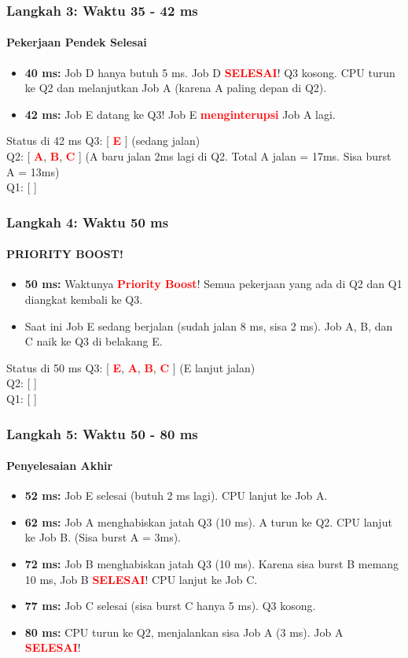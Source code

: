 \documentclass[t,aspectratio=169,xcolor=dvipsnames]{beamer}
\newcommand{\tem}[1]{\textbf{\textcolor{red}{#1}}}
\begin{document}
\begin{frame}
    \frametitle{Langkah 3: Waktu 35 - 42 ms}
    \framesubtitle{Pekerjaan Pendek Selesai}
    \footnotesize
    \begin{itemize}
        \item \textbf{40 ms:} Job D hanya butuh 5 ms. Job D \tem{SELESAI}! Q3 kosong. CPU turun ke Q2 dan melanjutkan Job A (karena A paling depan di Q2).
        \item \textbf{42 ms:} Job E datang ke Q3! Job E \tem{menginterupsi} Job A lagi.
    \end{itemize}
    \vspace{0.3cm}
    \begin{exampleblock}{Status di 42 ms}
        Q3: [ \tem{E} ] (sedang jalan) \\
        Q2: [ \tem{A}, \tem{B}, \tem{C} ] (A baru jalan 2ms lagi di Q2. Total A jalan = 17ms. Sisa burst A = 13ms) \\
        Q1: [ ]
    \end{exampleblock}
\end{frame}

\begin{frame}
    \frametitle{Langkah 4: Waktu 50 ms}
    \framesubtitle{PRIORITY BOOST!}
    \footnotesize
    \begin{itemize}
        \item \textbf{50 ms:} Waktunya \tem{Priority Boost}! Semua pekerjaan yang ada di Q2 dan Q1 diangkat kembali ke Q3.
        \item Saat ini Job E sedang berjalan (sudah jalan 8 ms, sisa 2 ms). Job A, B, dan C naik ke Q3 di belakang E.
    \end{itemize}
    \vspace{0.3cm}
    \begin{exampleblock}{Status di 50 ms}
        Q3: [ \tem{E}, \tem{A}, \tem{B}, \tem{C} ] (E lanjut jalan) \\
        Q2: [ ] \\
        Q1: [ ]
    \end{exampleblock}
\end{frame}

\begin{frame}
    \frametitle{Langkah 5: Waktu 50 - 80 ms}
    \framesubtitle{Penyelesaian Akhir}
    \small
    \begin{itemize}
        \item \textbf{52 ms:} Job E selesai (butuh 2 ms lagi). CPU lanjut ke Job A.
        \item \textbf{62 ms:} Job A menghabiskan jatah Q3 (10 ms). A turun ke Q2. CPU lanjut ke Job B. (Sisa burst A = 3ms).
        \item \textbf{72 ms:} Job B menghabiskan jatah Q3 (10 ms). Karena sisa burst B memang 10 ms, Job B \tem{SELESAI}! CPU lanjut ke Job C.
        \item \textbf{77 ms:} Job C selesai (sisa burst C hanya 5 ms). Q3 kosong.
        \item \textbf{80 ms:} CPU turun ke Q2, menjalankan sisa Job A (3 ms). Job A \tem{SELESAI}!
    \end{itemize}
\end{frame}
\end{document}
